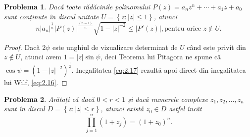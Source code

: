 \documentclass[a4paper,12pt,oneside]{report}
\newtheorem{problem}{Problema}
\begin{document}
\begin{problem}
Dacă toate rădăcinile polinomului \(P\left ( z \right ) = a_{n}z^{n} +\cdots +a_{1}z + a_{0}\) sunt conținute în discul unitate \(U= \left \{ z: \left | z \right |\leq 1 \right \}\), atunci
\begin{displaymath}
    n\left | a_{n} \right |^{\frac{1}{n}}\left | P\left ( z \right ) \right |^{\frac{\left ( n-1 \right )}{n}}\sqrt{1 - \left | z \right |^{-2}}\leq \left | {P}'\left ( z \right ) \right |, \text{pentru orice } z\notin U. \label{eq:2.17} \tag{2.17}
\end{displaymath}
\end{problem}
\begin{proof}
Dacă \(2\psi\) este unghiul de vizualizare determinat de \(U\) când este privit din \(z \notin U\), atunci avem \(1 = \left | z \right |\sin\psi\), deci Teorema lui Pitagora ne spune că \(\cos\psi = \left ( 1 - \left | z \right |^{-2} \right )^{\frac{1}{2}}\). Inegalitatea  \ref{eq:2.17} rezultă apoi direct din inegalitatea lui Wilf, \ref{eq:2.16}.
\end{proof}
\begin{problem}
Arătați că dacă \(0 < r < 1\) și dacă numerele complexe \(z_{1}, z_{2},...,z_{n}\) sunt în discul \(D = \left \{ z: \left | z \right | \leq r\right \}\), atunci există \(z_{0} \in D\) astfel încât
\begin{displaymath}
    \prod_{j = 1}^{n}\left ( 1 + z_{j} \right ) = \left ( 1 + z_{0} \right )^{n}.\label{eq:2.18} \tag{2.18}
\end{displaymath}
\end{problem}
\end{document}
